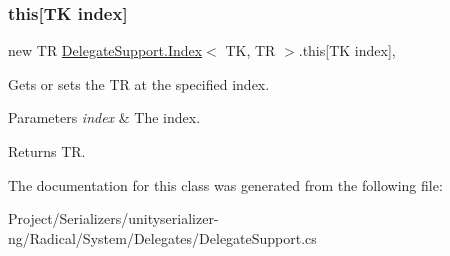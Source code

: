 \subsubsection{\texorpdfstring{this[T\+K index]}{this[TK index]}}
{\footnotesize\ttfamily new TR \hyperlink{class_delegate_support_1_1_index}{Delegate\+Support.\+Index}$<$ TK, TR $>$.this\mbox{[}TK index\mbox{]}\hspace{0.3cm}{\ttfamily [get]}, {\ttfamily [set]}}



Gets or sets the TR at the specified index. 


\begin{DoxyParams}{Parameters}
{\em index} & The index.\\
\hline
\end{DoxyParams}
\begin{DoxyReturn}{Returns}
TR.
\end{DoxyReturn}


The documentation for this class was generated from the following file\+:\begin{DoxyCompactItemize}
\item 
Project/\+Serializers/unityserializer-\/ng/\+Radical/\+System/\+Delegates/Delegate\+Support.\+cs\end{DoxyCompactItemize}
